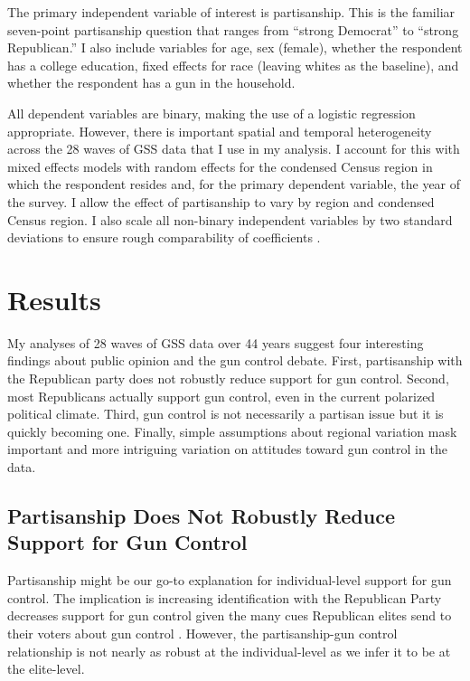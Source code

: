 \documentclass[11pt,]{article}
\begin{document}
The primary independent variable of interest is partisanship. This is
the familiar seven-point partisanship question that ranges from ``strong
Democrat'' to ``strong Republican.'' I also include variables for age,
sex (female), whether the respondent has a college education, fixed
effects for race (leaving whites as the baseline), and whether the
respondent has a gun in the household.

All dependent variables are binary, making the use of a logistic
regression appropriate. However, there is important spatial and temporal
heterogeneity across the 28 waves of GSS data that I use in my analysis.
I account for this with mixed effects models with random effects for the
condensed Census region in which the respondent resides and, for the
primary dependent variable, the year of the survey. I allow the effect
of partisanship to vary by region and condensed Census region. I also
scale all non-binary independent variables by two standard deviations to
ensure rough comparability of coefficients \citep{gelman2008sri}.

\section{Results}\label{results}

My analyses of 28 waves of GSS data over 44 years suggest four
interesting findings about public opinion and the gun control debate.
First, partisanship with the Republican party does not robustly reduce
support for gun control. Second, most Republicans actually support gun
control, even in the current polarized political climate. Third, gun
control is not necessarily a partisan issue but it is quickly becoming
one. Finally, simple assumptions about regional variation mask important
and more intriguing variation on attitudes toward gun control in the
data.

\subsection{Partisanship Does Not Robustly Reduce Support for Gun
Control}\label{partisanship-does-not-robustly-reduce-support-for-gun-control}

Partisanship might be our go-to explanation for individual-level support
for gun control. The implication is increasing identification with the
Republican Party decreases support for gun control given the many cues
Republican elites send to their voters about gun control
\citep[c.f.][]{zaller1992nomo}. However, the partisanship-gun control
relationship is not nearly as robust at the individual-level as we infer
it to be at the elite-level.
\end{document}
